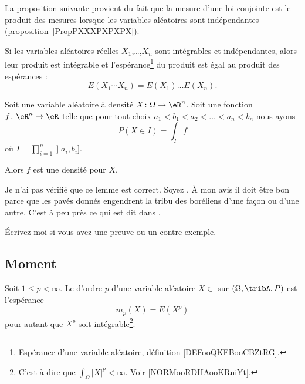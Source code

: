 La proposition suivante provient du fait que la mesure d'une loi conjointe est le produit des mesures lorsque les variables aléatoires sont indépendantes (proposition~\ref{PropPXXXPXPXPX}).
\begin{proposition}           \label{PROPooDKQDooREiSSf}
	Si les variables aléatoires réelles \( X_1\),\ldots,\( X_n\) sont intégrables et indépendantes, alors leur produit est intégrable et l'espérance\footnote{Espérance d'une variable aléatoire, définition \ref{DEFooQKFBooCBZtRG}.} du produit est égal au produit des espérances :
	\begin{equation}
		E(X_1\cdots X_n)=E(X_1)\ldots E(X_n).
	\end{equation}
\end{proposition}

\begin{lemma}       \label{LEMooIVIWooUUVStW}
	Soit une variable aléatoire à densité \( X\colon \Omega\to \eR^n\). Soit une fonction \( f\colon \eR^n\to \eR\) telle que pour tout choix \( a_1<b_1<a_2<\ldots <a_n<b_n\) nous ayons
	\begin{equation}
		P(X\in I)=\int_I f
	\end{equation}
	où \( I=\prod_{i=1}^n\mathopen] a_i , b_i \mathclose]\).

	Alors \( f\) est une densité pour \( X\).

	\begin{probleme}		\label{PROBooAHJSooWUuJhb}
		Je n'ai pas vérifié que ce lemme est correct. Soyez . À mon avis il doit être bon parce que les pavés donnés engendrent la tribu des boréliens d'une façon ou d'une autre. C'est à peu près ce qui est dit dans \cite{BIBooMECWooHQJweh}.

		Écrivez-moi si vous avez une preuve ou un contre-exemple.
	\end{probleme}
\end{lemma}


\subsection{Moment}

\begin{definition}		\label{DEFooTECPooMzGYgG}
	Soit \( 1\leq p<\infty\). Le  d'ordre \( p\) d'une variable aléatoire \( X\in\) sur \( (\Omega,\tribA,P)\) est l'espérance
	\begin{equation}
		m_p(X)=E(X^p)
	\end{equation}
	pour autant que \( X^p\) soit intégrable\footnote{C'est à dire que \( \int_{\Omega}| X |^p<\infty\). Voir \ref{NORMooRDHAooKRniYt}.}.
\end{definition}


